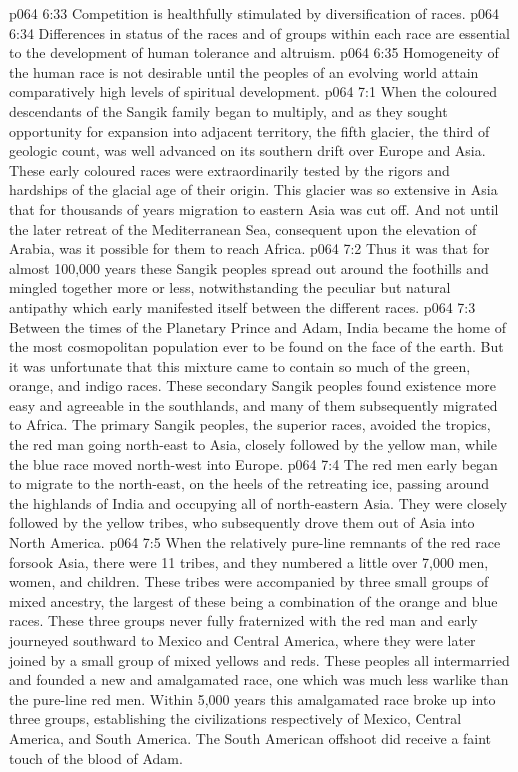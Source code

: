 \vs p064 6:33 \bibnobreakspace Competition is healthfully stimulated by diversification of races.
\vs p064 6:34 \bibnobreakspace Differences in status of the races and of groups within each race are essential to the development of human tolerance and altruism.
\vs p064 6:35 \bibnobreakspace Homogeneity of the human race is not desirable until the peoples of an evolving world attain comparatively high levels of spiritual development.
\vs p064 7:1 When the coloured descendants of the Sangik family began to multiply, and as they sought opportunity for expansion into adjacent territory, the fifth glacier, the third of geologic count, was well advanced on its southern drift over Europe and Asia. These early coloured races were extraordinarily tested by the rigors and hardships of the glacial age of their origin. This glacier was so extensive in Asia that for thousands of years migration to eastern Asia was cut off. And not until the later retreat of the Mediterranean Sea, consequent upon the elevation of Arabia, was it possible for them to reach Africa.
\vs p064 7:2 Thus it was that for almost 100,000 years these Sangik peoples spread out around the foothills and mingled together more or less, notwithstanding the peculiar but natural antipathy which early manifested itself between the different races.
\vs p064 7:3 Between the times of the Planetary Prince and Adam, India became the home of the most cosmopolitan population ever to be found on the face of the earth. But it was unfortunate that this mixture came to contain so much of the green, orange, and indigo races. These secondary Sangik peoples found existence more easy and agreeable in the southlands, and many of them subsequently migrated to Africa. The primary Sangik peoples, the superior races, avoided the tropics, the red man going north\hyp{}east to Asia, closely followed by the yellow man, while the blue race moved north\hyp{}west into Europe.
\vs p064 7:4 The red men early began to migrate to the north\hyp{}east, on the heels of the retreating ice, passing around the highlands of India and occupying all of north\hyp{}eastern Asia. They were closely followed by the yellow tribes, who subsequently drove them out of Asia into North America.
\vs p064 7:5 When the relatively pure\hyp{}line remnants of the red race forsook Asia, there were 11 tribes, and they numbered a little over 7,000 men, women, and children. These tribes were accompanied by three small groups of mixed ancestry, the largest of these being a combination of the orange and blue races. These three groups never fully fraternized with the red man and early journeyed southward to Mexico and Central America, where they were later joined by a small group of mixed yellows and reds. These peoples all intermarried and founded a new and amalgamated race, one which was much less warlike than the pure\hyp{}line red men. Within 5,000 years this amalgamated race broke up into three groups, establishing the civilizations respectively of Mexico, Central America, and South America. The South American offshoot did receive a faint touch of the blood of Adam.
